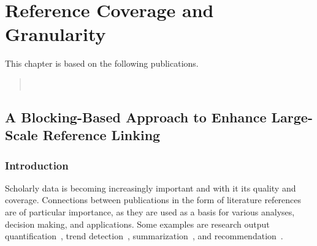 \chapter{Reference Coverage and Granularity}

This chapter is based on the following publications.
\begin{quote}
\\
\end{quote}


\section{A Blocking-Based Approach to Enhance Large-Scale Reference Linking}

\subsection{Introduction}
Scholarly data is becoming increasingly important and with it its quality and coverage. Connections between publications in the form of literature references are of particular importance, as they are used as a basis for various analyses, decision making, and applications. Some examples are research output quantification~\cite{Hirsch2005}, trend detection~\cite{Chen2006}, summarization~\cite{Elkiss2008}, and recommendation~\cite{Ma2020,Faerber202x}.

